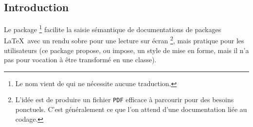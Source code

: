 

\usepackage[lang = french]{../main/main}
\usepackage{../macroenv/macroenv}
\usepackage{../inenglish/inenglish}




\subsection{Introduction}

Le package 
\footnote{
    Le nom vient de  qui ne nécessite aucune traduction.
}
facilite la saisie sémantique de documentations de packages \LaTeX\ avec un rendu sobre pour une lecture sur écran
\footnote{
    L'idée est de produire un fichier \texttt{PDF} efficace à parcourir pour des besoins ponctuels. C'est généralement ce que l'on attend d'une documentation liée au codage.
},
mais pratique pour les utilisateurs (ce package propose, ou impose, un style de mise en forme, mais il n'a pas pour vocation à être transformé en une classe).



